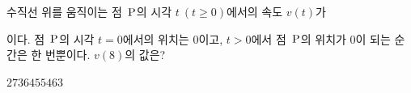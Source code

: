 수직선 위를 움직이는 점~$\mathrm{P}$의 시각 $t\ (t\ge 0)$에서의 속도 $v(t)$가 \par\smallskip{}\par\smallskip\noindent 이다. 점~$\mathrm{P}$의 시각 $t=0$에서의 위치는 $0$이고, $t>0$에서 점~$\mathrm{P}$의 위치가 $0$이 되는 순간은 한 번뿐이다. $v(8)$의 값은?
\begin{choices32}{$27$}{$36$}{$45$}{$54$}{$63$}\end{choices32}
